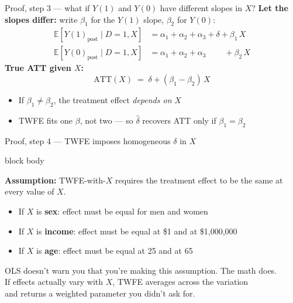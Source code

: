 \documentclass[aspectratio=169,11pt]{beamer}
\newcommand{\emphbox}[1]{%
  \begin{beamercolorbox}[rounded=true,sep=7pt,wd=\linewidth]{block body}%
    \small\color{slate}\raggedright #1%
  \end{beamercolorbox}}
\begin{document}
\begin{frame}{Proof, step 3 --- what if $Y(1)$ and $Y(0)$ have different slopes in $X$?}
\vspace{0.3em}
\textbf{Let the slopes differ:} write $\beta_1$ for the $Y(1)$ slope, $\beta_2$ for $Y(0)$:
\begin{align*}
\mathbb{E}[Y(1)_{\text{post}} \mid D{=}1, X] &= \alpha_1 + \alpha_2 + \alpha_3 + \delta + \beta_1\, X \\[3pt]
\mathbb{E}[Y(0)_{\text{post}} \mid D{=}1, X] &= \alpha_1 + \alpha_2 + \alpha_3 \phantom{\;+\;\delta} + \beta_2\, X
\end{align*}
\textbf{True ATT given $X$:}
\[
\text{ATT}(X) \;=\; \delta + (\beta_1 - \beta_2)\, X
\]
\begin{itemize}\setlength\itemsep{0.3em}\small
  \item If $\beta_1 \neq \beta_2$, the treatment effect \textit{depends on} $X$
  \item TWFE fits one $\beta$, not two --- so $\hat\delta$ recovers ATT only if $\beta_1 = \beta_2$
\end{itemize}
\end{frame}

\begin{frame}{Proof, step 4 --- TWFE imposes homogeneous $\delta$ in $X$}
\vspace{0.3em}
\emphbox{\textbf{Assumption:} TWFE-with-$X$ requires the treatment effect to be the same
at every value of $X$.}
\vspace{0.5em}
\begin{itemize}\setlength\itemsep{0.5em}
  \item If $X$ is \textbf{sex}: effect must be equal for men and women
  \item If $X$ is \textbf{income}: effect must be equal at \$1 and at \$1{,}000{,}000
  \item If $X$ is \textbf{age}: effect must be equal at 25 and at 65
\end{itemize}
\vspace{0.5em}
\begin{center}\color{warmgray}\small
OLS doesn't warn you that you're making this assumption. The math does.\\
If effects actually vary with $X$, TWFE averages across the variation\\
and returns a weighted parameter you didn't ask for.
\end{center}
\end{frame}
\end{document}
